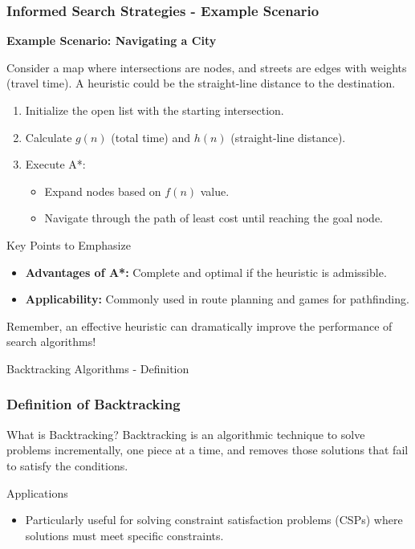 \documentclass[aspectratio=169]{beamer}
\begin{document}
\begin{frame}[fragile]
    \frametitle{Informed Search Strategies - Example Scenario}
    \textbf{Example Scenario: Navigating a City}

    Consider a map where intersections are nodes, and streets are edges with weights (travel time). A heuristic could be the straight-line distance to the destination.

    \begin{enumerate}
        \item Initialize the open list with the starting intersection.
        \item Calculate \( g(n) \) (total time) and \( h(n) \) (straight-line distance).
        \item Execute A*:
        \begin{itemize}
            \item Expand nodes based on \( f(n) \) value.
            \item Navigate through the path of least cost until reaching the goal node.
        \end{itemize}
    \end{enumerate}

    \begin{block}{Key Points to Emphasize}
        \begin{itemize}
            \item \textbf{Advantages of A*:} Complete and optimal if the heuristic is admissible.
            \item \textbf{Applicability:} Commonly used in route planning and games for pathfinding.
        \end{itemize}
    \end{block}

    Remember, an effective heuristic can dramatically improve the performance of search algorithms!
\end{frame}

\begin{frame}[fragile]{Backtracking Algorithms - Definition}
    \frametitle{Definition of Backtracking}
    \begin{block}{What is Backtracking?}
        Backtracking is an algorithmic technique to solve problems incrementally, one piece at a time, and removes those solutions that fail to satisfy the conditions. 
    \end{block}

    \begin{block}{Applications}
        \begin{itemize}
            \item Particularly useful for solving constraint satisfaction problems (CSPs) where solutions must meet specific constraints.
        \end{itemize}
    \end{block}

\end{frame}
\end{document}
